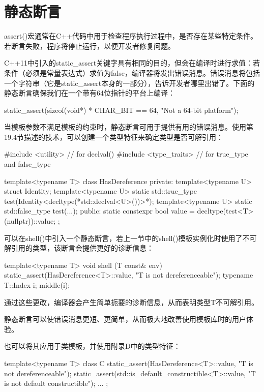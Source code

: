 \section{静态断言}
assert()宏通常在C++代码中用于检查程序执行过程中，是否存在某些特定条件。若断言失败，程序将停止运行，以便开发者修复问题。

C++11中引入的static\_assert关键字具有相同的目的，但会在编译时进行求值：若条件（必须是常量表达式）求值为false，编译器将发出错误消息。错误消息将包括一个字符串（它是static\_assert本身的一部分），告诉开发者哪里出错了。下面的静态断言确保我们在一个带有64位指针的平台上编译：

\begin{cpp}
static_assert(sizeof(void*) * CHAR_BIT == 64, "Not a 64-bit platform");
\end{cpp}

当模板参数不满足模板的约束时，静态断言可用于提供有用的错误消息。使用第19.4节描述的技术，可以创建一个类型特征来确定类型是否可解引用：

\begin{cpp}
#include <utility> // for declval()
#include <type_traits> // for true_type and false_type

template<typename T>
class HasDereference {
	private:
	template<typename U> struct Identity;
	template<typename U> static std::true_type
		test(Identity<decltype(*std::declval<U>())>*);
	template<typename U> static std::false_type
		test(...);
	public:
	static constexpr bool value = decltype(test<T>(nullptr))::value;
};
\end{cpp}

可以在shell()中引入一个静态断言，若上一节中的shell()模板实例化时使用了不可解引用的类型，该断言会提供更好的诊断信息：

\begin{cpp}
template<typename T>
void shell (T const& env) {
	static_assert(HasDereference<T>::value, "T is not dereferenceable");
	typename T::Index i;
	middle(i);
}
\end{cpp}

通过这些更改，编译器会产生简单扼要的诊断信息，从而表明类型T不可解引用。

静态断言可以使错误消息更短、更简单，从而极大地改善使用模板库时的用户体验。

也可以将其应用于类模板，并使用附录D中的类型特征：

\begin{cpp}
template<typename T>
class C {
	static_assert(HasDereference<T>::value, "T is not dereferenceable");
	static_assert(std::is_default_constructible<T>::value,
				  "T is not default constructible");
	...
};
\end{cpp}





































